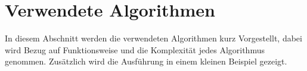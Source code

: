 \section{Verwendete Algorithmen}

In diesem Abschnitt werden die verwendeten Algorithmen kurz Vorgestellt, dabei wird Bezug auf Funktionsweise und die Komplexität jedes Algorithmus genommen. Zusätzlich wird die Ausführung in einem kleinen Beispiel gezeigt.
